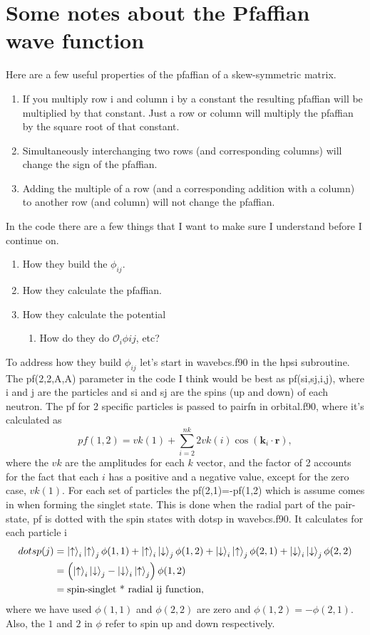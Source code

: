 \section{Some notes about the Pfaffian wave function}
Here are a few useful properties of the pfaffian of a skew-symmetric matrix.
\begin{enumerate}
   \item If you multiply row i and column i by a constant the resulting pfaffian will be multiplied by that constant. Just a row or column will multiply the pfaffian by the square root of that constant.
   \item Simultaneously interchanging two rows (and corresponding columns) will change the sign of the pfaffian.
   \item Adding the multiple of a row (and a corresponding addition with a column) to another row (and column) will not change the pfaffian.
\end{enumerate}

In the code there are a few things that I want to make sure I understand before I continue on.
\begin{enumerate}
   \item How they build the $\phi_{ij}$.
   \item How they calculate the pfaffian.
   \item How they calculate the potential
   \begin{enumerate}
      \item How do they do $\mathcal{O}_i\phi{ij}$, etc?
   \end{enumerate}
\end{enumerate}
To address how they build $\phi_{ij}$ let's start in wavebcs.f90 in the hpsi subroutine. The pf(2,2,A,A) parameter in the code I think would be best as pf(si,sj,i,j), where i and j are the particles and si and sj are the spins (up and down) of each neutron. The pf for 2 specific particles is passed to pairfn in orbital.f90, where it's calculated as
\begin{equation}
   pf(1,2)=vk(1)+\sum\limits_{i=2}^{nk} 2vk(i)\cos(\mathbf{k}_i\cdot\mathbf{r}),
\end{equation}
where the $vk$ are the amplitudes for each $k$ vector, and the factor of 2 accounts for the fact that each $i$ has a positive and a negative value, except for the zero case, $vk(1)$. For each set of particles the pf(2,1)=-pf(1,2) which is assume comes in when forming the singlet state. This is done when the radial part of the pair-state, pf is dotted with the spin states with dotsp in wavebcs.f90. It calculates for each particle i
\begin{align}
   dotsp(j) &= \left| \uparrow \right>_i\left| \uparrow \right>_j\phi(1,1)+\left| \uparrow \right>_i\left| \downarrow \right>_j\phi(1,2)+\left| \downarrow \right>_i\left| \uparrow \right>_j\phi(2,1)+\left| \downarrow \right>_i\left| \downarrow \right>_j\phi(2,2) \\
   &= \left(\left| \uparrow \right>_i\left| \downarrow \right>_j-\left| \downarrow \right>_i\left| \uparrow \right>_j\right)\phi(1,2) \\
   &= \text{spin-singlet * radial ij function},
\end{align}
where we have used $\phi(1,1)$ and $\phi(2,2)$ are zero and $\phi(1,2)=-\phi(2,1)$. Also, the $1$ and $2$ in $\phi$ refer to spin up and down respectively.

